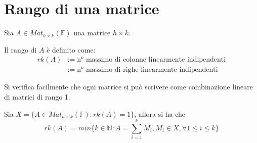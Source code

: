 \documentclass[../main.tex]{subfiles}
\begin{document}
\section{Rango di una matrice}
\begin{definition}
    Sia $A \in Mat_{h \times k}(\mathbb{F})$ una matrice $h \times k$.

    Il rango di $A$ è definito come:
    \begin{align*}
        rk(A) & := \; \text{n° massimo di colonne linearmente indipendenti} \\
              & := \; \text{n° massimo di righe linearmente indipendenti}
    \end{align*}
\end{definition}
Si verifica facilmente che ogni matrice si può scrivere come combinazione lineare di matrici di rango 1.

Sia $X = \{A \in Mat_{h \times k}(\mathbb{F}) : rk(A) = 1\}$, allora si ha che
\begin{equation*}
    rk(A) = min\{k \in \mathbb{N} : A = \sum_{i = 1}^{k} M_i , M_i \in X, \forall 1 \leq i \leq k\}
\end{equation*}
\end{document}

